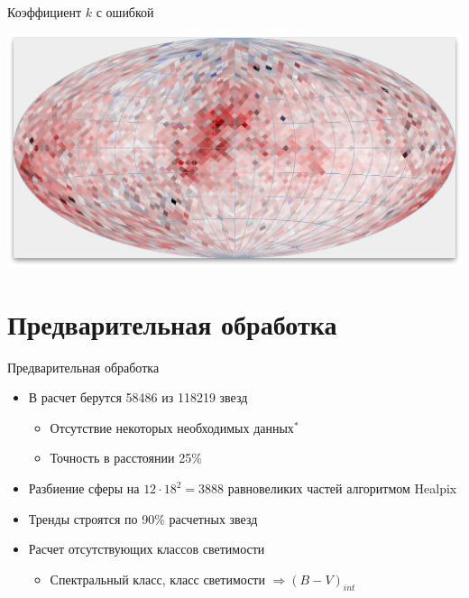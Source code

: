 \documentclass[14pt, fleqn, xcolor={dvipsnames, table}]{beamer}
\begin{document}
        \begin{frame}{Коэффициент $k$ с ошибкой}
            \begin{center}
                \includegraphics[scale=0.32]{map-k-sigma.png}
            \end{center}             
        \end{frame}
        

    \section{Предварительная обработка}                
        
        \begin{frame}{Предварительная обработка}
            \begin{itemize}
                \item В расчет берутся 58486 из 118219 звезд
                \begin{itemize}
                    \item Отсутствие некоторых необходимых данных$^*$
                    \item Точность в расстоянии 25\%
                \end{itemize}
                \item Разбиение сферы на $12 \cdot 18^2 = 3888$ равновеликих частей алгоритмом Healpix
                \item Тренды строятся по 90\% расчетных звезд
                \item Расчет отсутствующих классов светимости
                \begin{itemize}
                    \item Спектральный класс, класс светимости $\Longrightarrow (B - V)_{int}$
                \end{itemize}
            \end{itemize}
        \end{frame}
        
\end{document}
